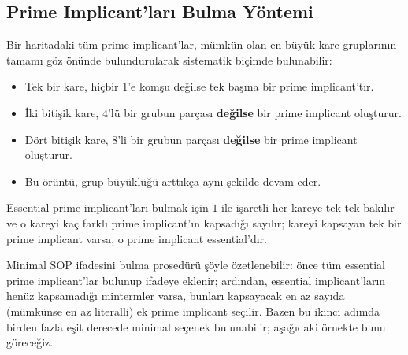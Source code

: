 \subsection{Prime Implicant'ları Bulma Yöntemi}\label{sec:prime-implicant-yontem}
Bir haritadaki tüm prime implicant'lar, mümkün olan en büyük kare gruplarının tamamı
göz önünde bulundurularak sistematik biçimde bulunabilir:
\begin{itemize}[nosep, leftmargin=*]
    \item Tek bir kare, hiçbir $1$'e komşu değilse tek başına bir prime implicant'tır.
    \item İki bitişik kare, $4$'lü bir grubun parçası \textbf{değilse} bir prime
    implicant oluşturur.
    \item Dört bitişik kare, $8$'li bir grubun parçası \textbf{değilse} bir prime
    implicant oluşturur.
    \item Bu örüntü, grup büyüklüğü arttıkça aynı şekilde devam eder.
\end{itemize}
Essential prime implicant'ları bulmak için $1$ ile işaretli her kareye tek tek bakılır ve
o kareyi kaç farklı prime implicant'ın kapsadığı sayılır; kareyi kapsayan tek bir prime
implicant varsa, o prime implicant essential'dır.

Minimal SOP ifadesini bulma prosedürü şöyle özetlenebilir: önce tüm essential prime
implicant'lar bulunup ifadeye eklenir; ardından, essential implicant'ların henüz
kapsamadığı mintermler varsa, bunları kapsayacak en az sayıda (mümkünse en az literalli)
ek prime implicant seçilir. Bazen bu ikinci adımda birden fazla eşit derecede minimal
seçenek bulunabilir; aşağıdaki örnekte bunu göreceğiz.


